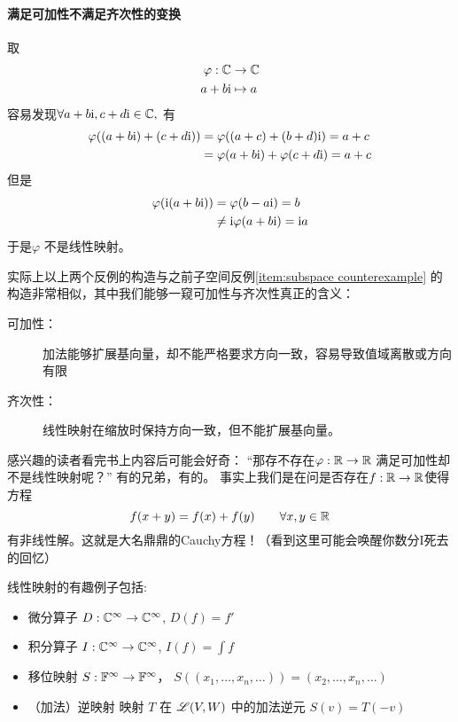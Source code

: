 \paragraph{满足可加性不满足齐次性的变换}
取
\begin{align*}
    \varphi: \mathbb{C} &\to \mathbb{C} \\
    a+b \mathrm{i} &\mapsto a
\end{align*}
容易发现\(\forall a+b\mathrm{i},c+d\mathrm{i} \in \mathbb{C},\) 有
\begin{align*}
    \varphi((a+b\mathrm{i})+(c+d\mathrm{i})) &= \varphi((a+c)+(b+d)\mathrm{i}) = a+c \\
    &=\varphi(a+b\mathrm{i}) + \varphi(c+d\mathrm{i}) =a+c
\end{align*}
但是
\begin{align*}
    \varphi(\mathrm{i}(a+b\mathrm{i})) &= \varphi(b-a\mathrm{i}) = b \\
    &\neq \mathrm{i}\varphi(a+b\mathrm{i}) =\mathrm{i} a
\end{align*}
于是\(\varphi\) 不是线性映射。

实际上以上两个反例的构造与之前子空间反例\ref{item:subspace
counterexample}
的构造非常相似，其中我们能够一窥可加性与齐次性真正的含义：
\begin{description}
    \item[可加性：] 加法能够扩展基向量，却不能严格要求方向一致，容易导致值域离散或方向有限
    \item[齐次性：] 线性映射在缩放时保持方向一致，但不能扩展基向量。
\end{description}

感兴趣的读者看完书上内容后可能会好奇： ``那存不存在\(\varphi: \mathbb{R} \to
\mathbb{R}\) 满足可加性却不是线性映射呢？'' 有的兄弟，有的。
事实上我们是在问是否存在\(f:\mathbb{R} \to \mathbb{R}\)使得方程
\[
    f(x+y) = f(x) + f(y) \qquad \forall x,y \in \mathbb{R}
\]
有非线性解。这就是大名鼎鼎的Cauchy方程！（看到这里可能会唤醒你数分I死去的回忆）

线性映射的有趣例子包括:
\begin{itemize}
    \item 微分算子 \(D: \mathbb{C}^{\infty} \to
        \mathbb{C}^{\infty}\), \(D(f) = f'\)
    \item 积分算子 \(I: \mathbb{C}^{\infty} \to
        \mathbb{C}^{\infty}\), \(I(f) = \int f\)
    \item 移位映射 \(S: \mathbb{F}^{\infty} \to \mathbb{F}^{\infty}\)，
        \(S((x_{1},\dots, x_{n}, \dots)) = (x_{2},\dots,
        x_{n}, \dots)\)
    \item （加法）逆映射 映射 \(T\) 在 \(\mathscr{L}(V,W)\) 中的加法逆元
        \(S(v)=T(-v)\)
\end{itemize}
